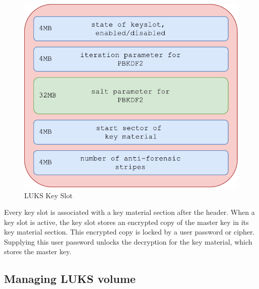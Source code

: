\begin{figure}[h]
    \centering
    \includegraphics[scale=0.6]{figures/LUKSkeyslot.pdf}
    \caption{LUKS Key Slot}
    \label{fig:luksslot}
\end{figure}
Every key slot is associated with a key material section after the header.
When a key slot is active, the key slot stores an encrypted copy of the master key in its key material section.
This encrypted copy is locked by a user password or cipher.
Supplying this user password unlocks the decryption for the key material, which stores the master key.

\subsection{Managing LUKS volume}

